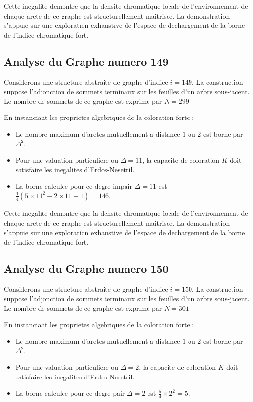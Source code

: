 \documentclass[11pt,a4paper]{article}
\begin{document}
Cette inegalite demontre que la densite chromatique locale de l'environnement de chaque arete de ce graphe est structurellement maitrisee. La demonstration s'appuie sur une exploration exhaustive de l'espace de dechargement de la borne de l'indice chromatique fort.

\subsection{Analyse du Graphe numero 149}
Considerons une structure abstraite de graphe d'indice $i = 149$. La construction suppose l'adjonction de sommets terminaux sur les feuilles d'un arbre sous-jacent. Le nombre de sommets de ce graphe est exprime par $N = 299$.

En instanciant les proprietes algebriques de la coloration forte :
\begin{itemize}
\item Le nombre maximum d'aretes mutuellement a distance $1$ ou $2$ est borne par $\Delta^2$.
\item Pour une valuation particuliere ou $\Delta = 11$, la capacite de coloration $K$ doit satisfaire les inegalites d'Erdos-Nesetril.
\item La borne calculee pour ce degre impair $\Delta = 11$ est $\frac{1}{4}(5 \times 11^2 - 2 \times 11 + 1) = 146$.
\end{itemize}

Cette inegalite demontre que la densite chromatique locale de l'environnement de chaque arete de ce graphe est structurellement maitrisee. La demonstration s'appuie sur une exploration exhaustive de l'espace de dechargement de la borne de l'indice chromatique fort.

\subsection{Analyse du Graphe numero 150}
Considerons une structure abstraite de graphe d'indice $i = 150$. La construction suppose l'adjonction de sommets terminaux sur les feuilles d'un arbre sous-jacent. Le nombre de sommets de ce graphe est exprime par $N = 301$.

En instanciant les proprietes algebriques de la coloration forte :
\begin{itemize}
\item Le nombre maximum d'aretes mutuellement a distance $1$ ou $2$ est borne par $\Delta^2$.
\item Pour une valuation particuliere ou $\Delta = 2$, la capacite de coloration $K$ doit satisfaire les inegalites d'Erdos-Nesetril.
\item La borne calculee pour ce degre pair $\Delta = 2$ est $\frac{5}{4} \times 2^2 = 5$.
\end{itemize}
\end{document}
